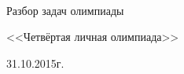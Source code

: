 \begin{titlepage}
\newpage
{}

~\vspace{5cm}

\Large{Разбор задач олимпиады}

\Large{<<Четвёртая личная олимпиада>>}

\Large{31.10.2015г.}

\end{titlepage}
